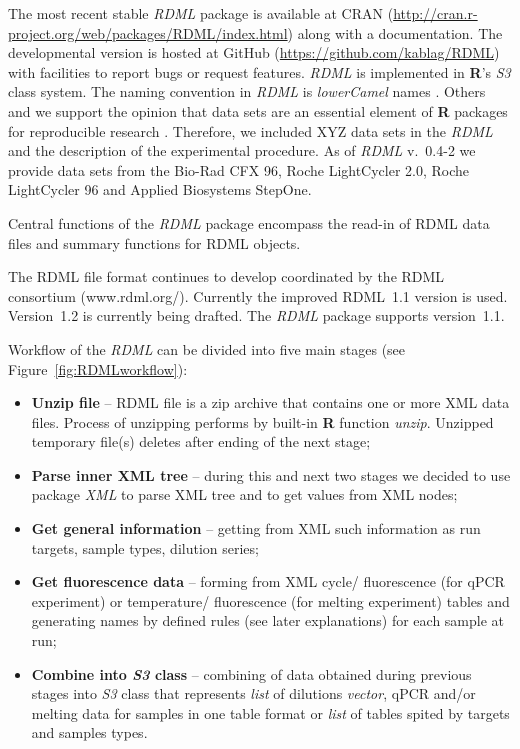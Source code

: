 \documentclass{bioinfo}
\begin{document}
The most recent stable \textit{RDML} package is available at CRAN 
(\url{http://cran.r-project.org/web/packages/RDML/index.html}) along with a 
documentation. The developmental version is hosted at GitHub 
(\url{https://github.com/kablag/RDML}) with facilities to report bugs or request 
features. \textit{RDML} is implemented in \textbf{R}’s \emph{S3} class system. 
The naming convention in \textit{RDML} is \textit{lowerCamel} names 
\cite{Baaaath_2012}. Others and we support the opinion that data sets are an 
essential element of \textbf{R} packages for reproducible research 
\cite{gentleman_2004,hofmann_2013,Leeper_2014}. Therefore, we included XYZ data 
sets in the \textit{RDML} and the description of the experimental procedure. As 
of \textit{RDML} v.~0.4-2 we provide data sets from the Bio-Rad CFX 96, Roche 
LightCycler 2.0, Roche LightCycler 96 and Applied Biosystems StepOne.

Central functions of the \textit{RDML} package encompass the read-in of RDML 
data files and summary functions for RDML objects.

The RDML file format continues to develop coordinated by the RDML consortium 
(www.rdml.org/). Currently the improved RDML~1.1 version is used. Version~1.2 is 
currently being drafted. The \textit{RDML} package supports version~1.1.

Workflow of the \textit{RDML} can be divided into five main stages (see Figure~\ref{fig:RDMLworkflow}):
\begin{itemize}
	\item \textbf{Unzip file} -- RDML file is a zip archive that contains one or more XML data files. Process of unzipping performs by built-in \textbf{R} function \textit{unzip}. Unzipped temporary file(s) deletes after ending of the next stage;
	\item \textbf{Parse inner XML tree} -- during this and next two stages we decided to use package \textit{XML} to parse XML tree and to get values from XML nodes;
	\item \textbf{Get general information} -- getting from XML such information as run targets, sample types, dilution series;
	\item \textbf{Get fluorescence data} -- forming from XML cycle/ fluorescence (for qPCR experiment) or temperature/ fluorescence (for melting experiment) tables and generating names by defined rules (see later explanations) for each sample at run;
	\item \textbf{Combine into \textit{S3} class} -- combining of data obtained during previous stages into \textit{S3} class that represents \textit{list} of dilutions \textit{vector}, qPCR and/or melting data for samples in one table format or \textit{list} of tables spited by targets and samples types.
\end{itemize}
\end{document}
